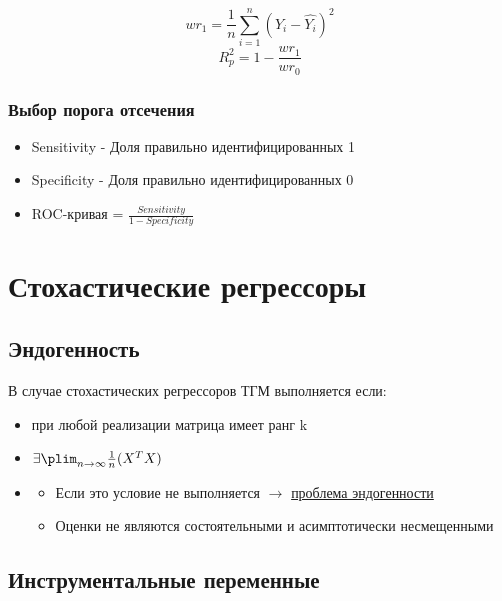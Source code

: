 \documentclass[a4paper, 12pt]{article}
\begin{document}
\[wr_{1} = \frac{1}{n}\sum_{i = 1}^{n}(Y_{i} - \hat{Y_{i}})^{2}\]
\[R^{2}_{p} = 1 - \frac{wr_{1}}{wr_{0}}\]

\subsubsection{Выбор порога отсечения}

\begin{itemize}
    \item Sensitivity - Доля правильно идентифицированных 1
    \item Specificity - Доля правильно идентифицированных 0
    \item ROC-кривая = $\frac{Sensitivity}{1 - Specificity}$
\end{itemize}

\section{Стохастические регрессоры}

\subsection{Эндогенность}

В случае стохастических регрессоров ТГМ выполняется если:

\begin{itemize}
    \item при любой реализации матрица имеет ранг k
    \item $\exists \plim_{n \to \infty} \frac{1}{n}(X^{T}X)$
    \item {}
    \begin{itemize}
        \item Если это условие не выполняется $\rightarrow$ \underline{проблема эндогенности}
        \item Оценки не являются состоятельными и асимптотически несмещенными
    \end{itemize}
\end{itemize}

\subsection{Инструментальные переменные}
\end{document}
